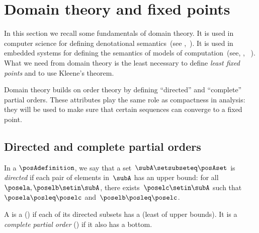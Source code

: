 
\section{Domain theory and fixed points}
\label{sec:Monotonicity-and-fixed}

In this section we recall some fundamentals of domain theory.
It is used in computer science for defining denotational semantics~(see \eg,~\cite{manes86}).
It is used in embedded systems for defining the semantics of models of computation~(see, \eg, ~\cite{lee10}).
What we need from domain theory is the least necessary to define \emph{least fixed points} and to use Kleene's theorem.

Domain theory builds on order theory by defining ``directed'' and ``complete'' partial orders.
These attributes play the same role as compactness in analysis: they will be used to make sure that certain sequences can converge to a fixed point.

\subsection{Directed and complete partial orders}

\begin{definition}
    \label{def:directed-set}
    In a  $\posAdefinition$, we say that a set~$\subA\setsubseteq\posAset$ is \emph{directed} if each pair of elements in~$\subA$ has an upper bound: for all~$\posela,\poselb \setin \subA$, there exists~$\poselc\setin \subA$ such that~$\posela\posleq \poselc$ and~$\poselb\posleq \poselc$.
\end{definition}


\begin{definition}[Completeness]
    \label{def:cpo}
    A  is a  (\DCPO) if each of its directed subsets has a  (least of upper bounds).
    It is a \emph{complete partial order} (\CPO) if it also has a bottom.
\end{definition}

